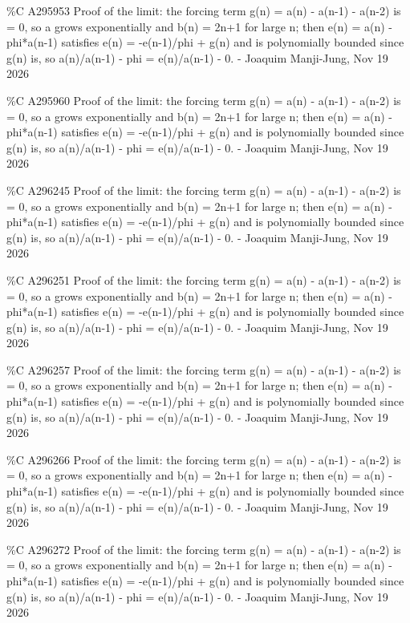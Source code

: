 {\%C A295953 Proof of the limit: the forcing term g(n) = a(n) - a(n-1) - a(n-2) is = 0, so a grows exponentially and b(n) = 2n+1 for large n; then e(n) = a(n) - phi*a(n-1) satisfies e(n) = -e(n-1)/phi + g(n) and is polynomially bounded since g(n) is, so a(n)/a(n-1) - phi = e(n)/a(n-1) - 0. - Joaquim Manji-Jung, Nov 19 2026\par
\%C A295960 Proof of the limit: the forcing term g(n) = a(n) - a(n-1) - a(n-2) is = 0, so a grows exponentially and b(n) = 2n+1 for large n; then e(n) = a(n) - phi*a(n-1) satisfies e(n) = -e(n-1)/phi + g(n) and is polynomially bounded since g(n) is, so a(n)/a(n-1) - phi = e(n)/a(n-1) - 0. - Joaquim Manji-Jung, Nov 19 2026\par
\%C A296245 Proof of the limit: the forcing term g(n) = a(n) - a(n-1) - a(n-2) is = 0, so a grows exponentially and b(n) = 2n+1 for large n; then e(n) = a(n) - phi*a(n-1) satisfies e(n) = -e(n-1)/phi + g(n) and is polynomially bounded since g(n) is, so a(n)/a(n-1) - phi = e(n)/a(n-1) - 0. - Joaquim Manji-Jung, Nov 19 2026\par
\%C A296251 Proof of the limit: the forcing term g(n) = a(n) - a(n-1) - a(n-2) is = 0, so a grows exponentially and b(n) = 2n+1 for large n; then e(n) = a(n) - phi*a(n-1) satisfies e(n) = -e(n-1)/phi + g(n) and is polynomially bounded since g(n) is, so a(n)/a(n-1) - phi = e(n)/a(n-1) - 0. - Joaquim Manji-Jung, Nov 19 2026\par
\%C A296257 Proof of the limit: the forcing term g(n) = a(n) - a(n-1) - a(n-2) is = 0, so a grows exponentially and b(n) = 2n+1 for large n; then e(n) = a(n) - phi*a(n-1) satisfies e(n) = -e(n-1)/phi + g(n) and is polynomially bounded since g(n) is, so a(n)/a(n-1) - phi = e(n)/a(n-1) - 0. - Joaquim Manji-Jung, Nov 19 2026\par
\%C A296266 Proof of the limit: the forcing term g(n) = a(n) - a(n-1) - a(n-2) is = 0, so a grows exponentially and b(n) = 2n+1 for large n; then e(n) = a(n) - phi*a(n-1) satisfies e(n) = -e(n-1)/phi + g(n) and is polynomially bounded since g(n) is, so a(n)/a(n-1) - phi = e(n)/a(n-1) - 0. - Joaquim Manji-Jung, Nov 19 2026\par
\%C A296272 Proof of the limit: the forcing term g(n) = a(n) - a(n-1) - a(n-2) is = 0, so a grows exponentially and b(n) = 2n+1 for large n; then e(n) = a(n) - phi*a(n-1) satisfies e(n) = -e(n-1)/phi + g(n) and is polynomially bounded since g(n) is, so a(n)/a(n-1) - phi = e(n)/a(n-1) - 0. - Joaquim Manji-Jung, Nov 19 2026\par
}
